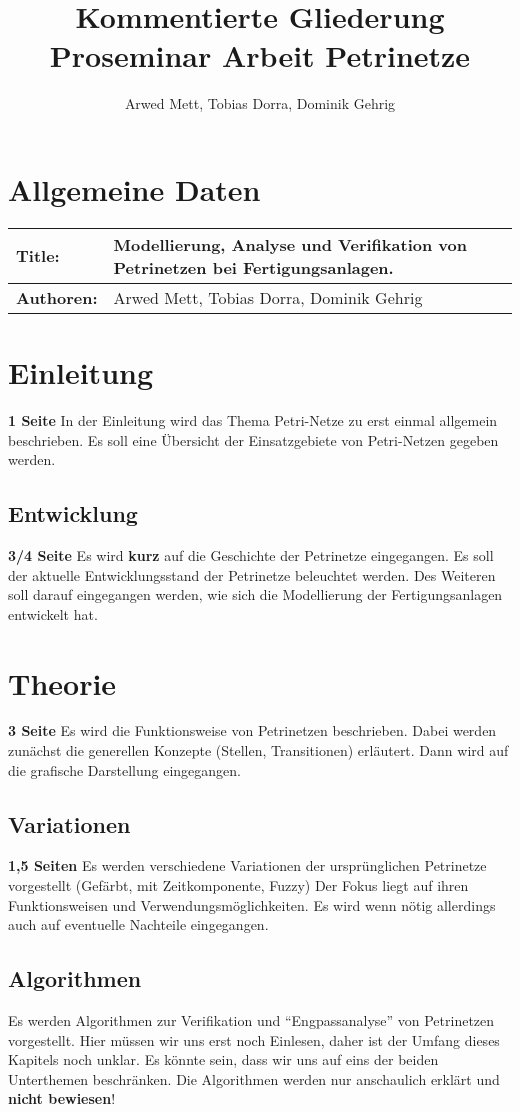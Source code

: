 \documentclass{article}
\author{Arwed Mett, Tobias Dorra, Dominik Gehrig}
\title{Kommentierte Gliederung Proseminar Arbeit Petrinetze}
\begin{document}
\maketitle

\section{Allgemeine Daten}
\begin{tabularx}{\textwidth}{|X|X|}
    \hline
    \textbf{Title:} & Modellierung, Analyse und Verifikation von Petrinetzen bei Fertigungsanlagen.\\
    \hline
    \textbf{Authoren:} & Arwed Mett, Tobias Dorra, Dominik Gehrig\\
    \hline
\end{tabularx}
\section{Einleitung}
\textbf{1 Seite}
In der Einleitung wird das Thema Petri-Netze zu erst einmal allgemein beschrieben.
Es soll eine Übersicht der Einsatzgebiete von Petri-Netzen gegeben werden.

\subsection{Entwicklung}
\textbf{3/4 Seite}
Es wird \textbf{kurz} auf die Geschichte der Petrinetze eingegangen.
Es soll der aktuelle Entwicklungsstand der Petrinetze beleuchtet werden.
Des Weiteren soll darauf eingegangen werden, wie sich die Modellierung der Fertigungsanlagen entwickelt hat.
\section{Theorie} 
\textbf{3 Seite}
Es wird die Funktionsweise von Petrinetzen beschrieben.
Dabei werden zunächst die generellen Konzepte (Stellen, Transitionen) erläutert.
Dann wird auf die grafische Darstellung eingegangen.

\subsection{Variationen}
\textbf{1,5 Seiten}
Es werden verschiedene Variationen der ursprünglichen Petrinetze vorgestellt (Gefärbt, mit Zeitkomponente, Fuzzy)
Der Fokus liegt auf ihren Funktionsweisen und Verwendungsmöglichkeiten.
Es wird wenn nötig allerdings auch auf eventuelle Nachteile eingegangen. 

\subsection{Algorithmen}
Es werden Algorithmen zur Verifikation und "`Engpassanalyse"' von Petrinetzen vorgestellt.
Hier müssen wir uns erst noch Einlesen, daher ist der Umfang dieses Kapitels noch unklar. Es könnte sein, dass wir uns auf eins der beiden Unterthemen beschränken.
Die Algorithmen werden nur anschaulich erklärt und \textbf{nicht bewiesen}!
\end{document}

